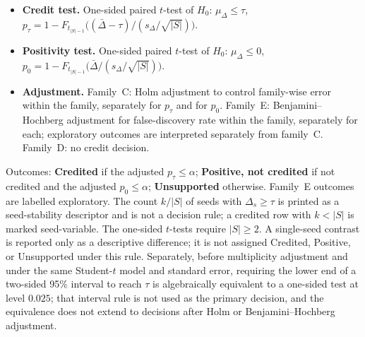 \begin{itemize}
  \item \textbf{Credit test.} One-sided paired $t$-test of
  $H_0{:}\,\mu_\Delta\le\tau$,
  $p_\tau=1-F_{t_{|S|-1}}\bigl((\bar\Delta-\tau)/(s_\Delta/\sqrt{|S|})\bigr)$.
  \item \textbf{Positivity test.} One-sided paired $t$-test of
  $H_0{:}\,\mu_\Delta\le 0$,
  $p_0=1-F_{t_{|S|-1}}\bigl(\bar\Delta/(s_\Delta/\sqrt{|S|})\bigr)$.
  \item \textbf{Adjustment.} Family~C: Holm adjustment to control
  family-wise error within the family, separately for $p_\tau$ and for
  $p_0$. Family~E: Benjamini--Hochberg adjustment for false-discovery
  rate within the family, separately for each; exploratory outcomes are
  interpreted separately from family~C. Family~D: no credit decision.
\end{itemize}

Outcomes: \textbf{Credited} if the adjusted $p_\tau\le\alpha$;
\textbf{Positive, not credited} if not credited and the adjusted
$p_0\le\alpha$; \textbf{Unsupported} otherwise. Family~E outcomes are
labelled exploratory. The count $k/|S|$ of seeds with
$\Delta_s\ge\tau$ is printed as a seed-stability descriptor and is not
a decision rule; a credited row with $k{<}|S|$ is marked seed-variable.
The one-sided $t$-tests require $|S|\ge 2$. A single-seed contrast is
reported only as a descriptive difference; it is not assigned Credited,
Positive, or Unsupported under this rule. Separately, before
multiplicity adjustment and under the same Student-$t$ model and
standard error, requiring the lower end of a two-sided 95\% interval to
reach $\tau$ is algebraically equivalent to a one-sided test at level
$0.025$; that interval rule is not used as the primary decision, and
the equivalence does not extend to decisions after Holm or
Benjamini--Hochberg adjustment.

